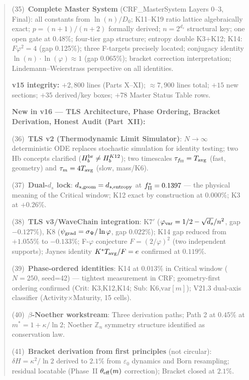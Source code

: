 \documentclass[12pt, a4paper]{article}
\begin{document}
\begin{abstract}
(35)~\textbf{Complete Master System} (CRF\_MasterSystem Layers 0--3, Final): all constants from $\ln(n)/D_0$; K11--K19 ratio lattice algebraically exact; $p=(n+1)/(n+2)$ formally derived; $n=2^{d_s}$ structural key; one open gate at 0.48\%; four-tier gap structure; entropy double K3+K12; K14: $F\varphi^2=4$ (gap 0.125\%); three F-targets precisely located; conjugacy identity $\ln(n)\cdot\ln(\varphi)\approx 1$ (gap 0.065\%); bracket correction interpretation; Lindemann--Weierstrass perspective on all identities.

\textbf{v15 integrity:} $+2{,}800$ lines (Parts X--XI); $\approx 7{,}900$ lines total;
$+15$ new sections; $+35$ derived/key boxes; $+78$ Master Status Table rows.

\textbf{New in v16 --- TLS Architecture, Phase Ordering, Bracket Derivation, Honest Audit (Part~XII):}

(36)~\textbf{TLS v2 (Thermodynamic Limit Simulator)}: $N\to\infty$ deterministic ODE replaces stochastic simulation for identity testing; two Hb concepts clarified ($H_b^{\rm br} \neq H_b^{K12}$); two timescales $\tau_{f_{\rm II}} = T_{\rm avg}$ (fast, geometry) and $\tau_m = 4T_{\rm avg}$ (slow, mass/K6).

(37)~\textbf{Dual-$d_s$ lock}: $d_{s,\rm geom} = d_{s,\rm entropy}$ at $f_{\rm II}^* = 0.1397$ --- the physical meaning of the Critical window; K12 exact by construction at $0.000\%$; K3 at $+0.26\%$.

(38)~\textbf{TLS v3/WaveChain integration}: K7$'$ ($\varphi_{\rm var} = 1/2 - \sqrt{d_s}/n^2$, gap $-0.127\%$), K8 ($\psi_{\rm grad} = \sigma_\Psi/\ln\varphi$, gap $0.022\%$); K14 gap reduced from $+1.055\%$ to $-0.133\%$; F-$\varphi$ conjecture $F = (2/\varphi)^2$ (two independent supports); Jaynes identity $K^*T_{\rm avg}/F = e$ confirmed at $0.119\%$.

(39)~\textbf{Phase-ordered identities}: K14 at $\mathbf{0.013\%}$ in Critical window ($N=250$, seed=42) --- tightest measurement in CRF; geometry-first ordering confirmed (Crit: K3,K12,K14; Sub: K6,$\text{var}[m]$); V21.3 dual-axis classifier (Activity$\times$Maturity, 15 cells).

(40)~\textbf{$\beta$-Noether workstream}: Three derivation paths; Path 2 at $0.45\%$ at $m^*=1+\kappa/\ln 2$; Noether $\mathbb{Z}_n$ symmetry structure identified as conservation law.

(41)~\textbf{Bracket derivation from first principles} (not circular): $\delta H = \kappa^2/\ln 2$ derived to $2.1\%$ from $\varepsilon_0$ dynamics and Born resampling; residual locatable (Phase~II $\theta_{\rm eff}(m)$ correction); Bracket closed at $2.1\%$.


\end{abstract}
\end{document}
